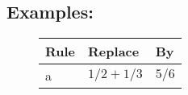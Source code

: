 \documentclass[12pt,fleqn]{article}
\begin{document}
   \subsection*{Examples:}

   
   \begin{figure}[htb]
      \centering

       \begin{tabular}{|l|l|l|} \hline
         Rule & Replace  & By   \\ \hline 
         a & $1/2 + 1/3$ & $5/6$ \\ \hline
       \end{tabular}
      \end{figure}
    
\end{document}
